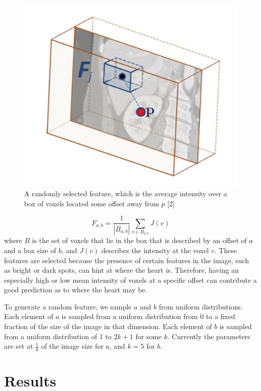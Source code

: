 \begin{figure}
\includegraphics[scale=0.4]{feature.png}
\caption{A randomly selected feature, which is the average intensity over a box of voxels located some offset away from $p$ [2]}
\end{figure}

\begin{equation}
  F_{a, b} = \frac{1}{|B_{a,b}|} \sum_{v \in B_{a, b}} J(v)
\end{equation}
where $B$ is the set of voxels that lie in the box that is described by an offset of $a$ and a box size of $b$, and $J(v)$ describes the intensity at the voxel $v$. These features are selected because the presence of certain features in the image, such as bright or dark spots, can hint at where the heart is. Therefore, having an especially high or low mean intensity of voxels at a specific offset can contribute a good prediction as to where the heart may be.

To generate a random feature, we sample $a$ and $b$ from uniform distributions. Each element of $a$ is sampled from a uniform distribution from 0 to a fixed fraction of the size of the image in that dimension. Each element of $b$ is sampled from a uniform distribution of 1 to $2k+1$ for some $k$. Currently the parameters are set at $\frac{1}{6}$ of the image size for $a$, and $k = 5$ for $b$. 

\section{Results}

